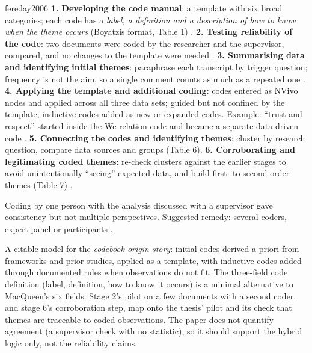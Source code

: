 \begin{papercard}{fereday2006}
 \textbf{1. Developing the code manual}: a template with six broad categories; each code has a \emph{label, a definition and a description of how to know when the theme occurs} (Boyatzis format, Table 1) . \textbf{2. Testing reliability of the code}: two documents were coded by the researcher and the supervisor, compared, and no changes to the template were needed . \textbf{3. Summarising data and identifying initial themes}: paraphrase each transcript by trigger question; frequency is not the aim, so a single comment counts as much as a repeated one . \textbf{4. Applying the template and additional coding}: codes entered as NVivo nodes and applied across all three data sets; guided but not confined by the template; inductive codes added as new or expanded codes. Example: ``trust and respect'' started inside the We-relation code and became a separate data-driven code . \textbf{5. Connecting the codes and identifying themes}: cluster by research question, compare data sources and groups (Table 6). \textbf{6. Corroborating and legitimating coded themes}: re-check clusters against the earlier stages to avoid unintentionally ``seeing'' expected data, and build first- to second-order themes (Table 7) .

 Coding by one person with the analysis discussed with a supervisor gave consistency but not multiple perspectives. Suggested remedy: several coders, expert panel or participants .

 A citable model for the \emph{codebook origin story}: initial codes derived a priori from frameworks and prior studies, applied as a template, with inductive codes added through documented rules when observations do not fit. The three-field code definition (label, definition, how to know it occurs) is a minimal alternative to MacQueen's six fields. Stage 2's pilot on a few documents with a second coder, and stage 6's corroboration step, map onto the thesis' pilot and its check that themes are traceable to coded observations. The paper does not quantify agreement (a supervisor check with no statistic), so it should support the hybrid logic only, not the reliability claims.
\end{papercard}
